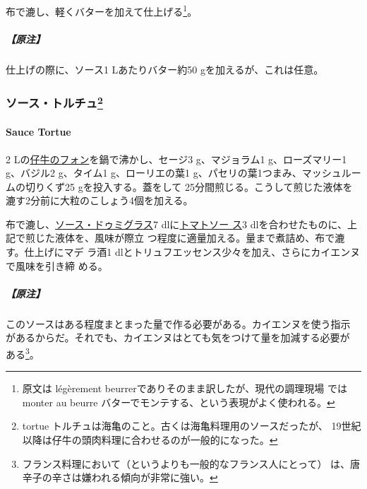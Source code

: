 \begin{recette}
布で漉し、軽くバターを加えて仕上げる\footnote{原文は légèrement
  beurrerでありそのまま訳したが、現代の調理現場 ではmonter au beurre
  バターでモンテする、という表現がよく使われる。}。

\hypertarget{ux539fux6ce8-9}{%
\subparagraph{【原注】}\label{ux539fux6ce8-9}}

仕上げの際に、ソース1 Lあたりバター約50 gを加えるが、これは任意。

\maeaki

\hypertarget{ux30bdux30fcux30b9ux30c8ux30ebux30c1ux30e593}{%
\subsubsection[ソース・トルチュ]{\texorpdfstring{ソース・トルチュ\footnote{tortue
  トルチュは海亀のこと。古くは海亀料理用のソースだったが、
  19世紀以降は仔牛の頭肉料理に合わせるのが一般的になった。}}{ソース・トルチュ}}\label{ux30bdux30fcux30b9ux30c8ux30ebux30c1ux30e593}}

\hypertarget{sauce-tortue}{%
\paragraph{Sauce Tortue}\label{sauce-tortue}}


2\undemi{}
Lの\protect\hyperlink{fonds-de-veau-brun}{仔牛のフォン}を鍋で沸かし、セージ3
g、マジョラム1 g、ローズマリー1 g、バジル2 g、タイム1 g、ローリエの葉1
g、パセリの葉1つまみ、マッシュルームの切りくず25 gを投入する。蓋をして
25分間煎じる。こうして煎じた液体を漉す2分前に大粒のこしょう4個を加える。

布で漉し、\protect\hyperlink{sauce-demi-glace}{ソース・ドゥミグラス}7
dlに\protect\hyperlink{sauce-tomate}{トマトソー ス}3
dlを合わせたものに、上記で煎じた液体を、風味が際立
つ程度に適量加える。\troisquarts{}量まで煮詰め、布で漉す。仕上げにマデ
ラ酒1 dlとトリュフエッセンス少々を加え、さらにカイエンヌで風味を引き締
める。

\hypertarget{ux539fux6ce8-10}{%
\subparagraph{【原注】}\label{ux539fux6ce8-10}}

このソースはある程度まとまった量で作る必要がある。カイエンヌを使う指示
があるからだ。それでも、カイエンヌはとても気をつけて量を加減する必要が
ある\footnote{フランス料理において（というよりも一般的なフランス人にとって）
  は、唐辛子の辛さは嫌われる傾向が非常に強い。}。


\end{recette}
